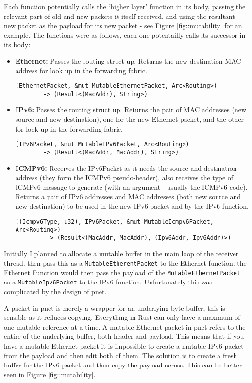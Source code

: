 \documentclass[12pt,a4paper,twoside,openright]{report}
\begin{document}
Each function potentially calls the `higher layer' function in its body, passing the relevant part of old and new packets it itself received, and using the resultant new packet as the payload for its new packet - see \hyperref[fig::mutability]{Figure }\ref{fig::mutability} for an example. The functions were as follows, each one potentailly calls its successor in its body:
\begin{itemize}
\item \textbf{Ethernet:} Passes the routing struct up. Returns the new destination MAC address for look up in the forwarding fabric.
\begin{verbatim}(EthernetPacket, &mut MutableEthernetPacket, Arc<Routing>)
        -> (Result<(MacAddr), String>)
\end{verbatim}
\item \textbf{IPv6:} Passes the routing struct up. Returns the pair of MAC addresses (new source and new destination), one for the new Ethernet packet, and the other for look up in the forwarding fabric.
\begin{verbatim}(IPv6Packet, &mut MutableIPv6Packet, Arc<Routing>)
        -> (Result<(MacAddr, MacAddr), String>)
\end{verbatim}
\item \textbf{ICMPv6:} Receives the IPv6Packet as it needs the source and destination address (they form the ICMPv6 pseudo-header), also receives the type of ICMPv6 message to generate (with an argument - usually the ICMPv6 code). Returns a pair of  IPv6 addresses and MAC addresses (both new source and new destination) to be used in the new IPv6 packet and by the IPv6 function.
\begin{verbatim}((Icmpv6Type, u32), IPv6Packet, &mut MutableIcmpv6Packet, Arc<Routing>) 
         -> (Result<(MacAddr, MacAddr), (Ipv6Addr, Ipv6Addr)>)
\end{verbatim}
\end{itemize}
Initially I planned to allocate a mutable buffer in the main loop of the receiver thread, then pass this as a \verb!MutableEtherentPacket! to the Ethernet function, the Ethernet Function would then pass the payload of the \verb!MutableEthernetPacket! as a \verb!MutableIpv6Packet! to the IPv6 function. Unfortunately this was complicated by the design of pnet.  

A packet in pnet is merely a wrapper for an underlying byte buffer, this is sensible as it reduces copying.  Everything in Rust can only have a maximum of one mutable reference at a time.  A mutable Ethernet packet in pnet refers to the entire of the underlying buffer, both header and payload.  This means that if you have a mutable Ethernet packet it is impossible to create a mutable IPv6 packet from the payload and then edit both of them.  The solution is to create a fresh buffer for the IPv6 packet and then copy the payload across. This can be better seen in  \hyperref[fig::mutability]{Figure }\ref{fig::mutability}.
\end{document}
